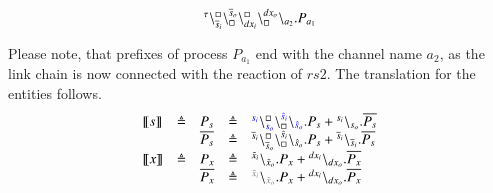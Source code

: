 \begin{example}
\[\begin{array}{lcl}
\startchain{\silent}\chainedlink{\overline{s}_i}{\noact}\chainedlink{\noact}{\overline{s}_o}    \chainedlink{dx_i}{\noact}\chainedlink{\noact}{dx_o}\chainend{a_2}.P_{a_1}\\
%
\end{array}
\]

\noindent
Please note, that prefixes of process $P_{a_1}$ end with the channel name $a_2$, as the link chain is now connected with the  reaction of  $rs2$.
The translation for the entities follows.
\[
\begin{array}{lclcl}
\llbracket s \rrbracket &\defeq &P_{s} &\defeq & \startchain{{\color{blue}s_i}}\chainedlink{{\color{blue}s_o}}{\noact}\chainedlink{\noact}{{\color{blue}\hat{s}_i}}\chainend{{\color{blue}\hat{s}_o}}.P_{s} + \startchain{s_i}\chainend{s_o}.\overline{P_{s}}\\
&& \overline{P_{s}}&\defeq &\startchain{\overline{s}_i}\chainedlink{\overline{s}_o}{\noact}\chainedlink{\noact}{\hat{s}_i}\chainend{\hat{s}_o}.P_{s}+\startchain{\overline{s}_i}\chainend{\overline{s}_i}.\overline{P_{s}}\\
\llbracket x \rrbracket &\defeq & P_{x}& \defeq &\startchain{\tilde{x}_i}\chainend{\tilde{x}_o}.P_{x} +  \startchain{dx_i}\chainend{dx_o}.\overline{P_{x}}\\
&& \overline{P_{x}}&\defeq &\startchain{{\color{gray}\tilde{x}_i}}\chainend{{\color{gray}\tilde{x}_o}}.P_{x} +  \startchain{dx_i}\chainend{dx_o}.\overline{P_{x}}\\
%


\end{array}\]
\end{example}
